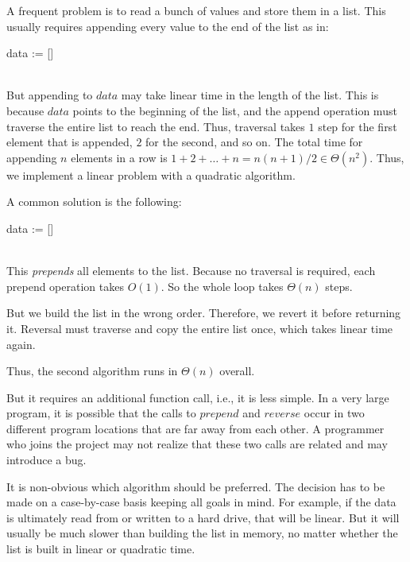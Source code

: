 \begin{example}
A frequent problem is to read a bunch of values and store them in a list.
This usually requires appending every value to the end of the list as in:

\begin{acode}
data := []\\
\\
\end{acode}

But appending to $data$ may take linear time in the length of the list.
This is because $data$ points to the beginning of the list, and the append operation must traverse the entire list to reach the end.
Thus, traversal takes $1$ step for the first element that is appended, $2$ for the second, and so on.
The total time for appending $n$ elements in a row is $1+2+\ldots+n=n(n+1)/2\in \Theta(n^2)$.
Thus, we implement a linear problem with a quadratic algorithm.
\medskip

A common solution is the following:

\begin{acode}
data := []\\
\\
\end{acode}

This \emph{prepends} all elements to the list.
Because no traversal is required, each prepend operation takes $O(1)$.
So the whole loop takes $\Theta(n)$ steps.

But we build the list in the wrong order.
Therefore, we revert it before returning it.
Reversal must traverse and copy the entire list once, which takes linear time again.

Thus, the second algorithm runs in $\Theta(n)$ overall.

But it requires an additional function call, i.e., it is less simple.
In a very large program, it is possible that the calls to $prepend$ and $reverse$ occur in two different program locations that are far away from each other.
A programmer who joins the project may not realize that these two calls are related and may introduce a bug.
\medskip

It is non-obvious which algorithm should be preferred.
The decision has to be made on a case-by-case basis keeping all goals in mind.
For example, if the data is ultimately read from or written to a hard drive, that will be linear.
But it will usually be much slower than building the list in memory, no matter whether the list is built in linear or quadratic time.
\end{example}


